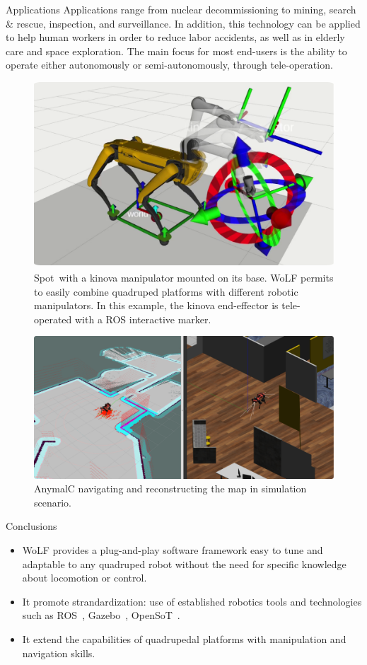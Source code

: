 	
\vspace{-20pt}	
\begin{myblock}{\large Applications} 
Applications range from nuclear decommissioning to mining, search \& rescue, inspection, and surveillance. In addition, this technology can be applied to help human workers
in order to reduce labor accidents, as well as in elderly
care and space exploration. The main focus for most end-users is the ability to operate either autonomously or semi-autonomously, through tele-operation.
%	
\begin{figure}[thb!]
	\centering
	\includegraphics[width=0.5\columnwidth]{images/spot_arm.pdf}
	\caption{Spot\textsuperscript\textregistered \  with a kinova manipulator mounted on its base. WoLF permits to easily combine quadruped platforms with different robotic manipulators. In this example, the kinova end-effector is tele-operated with a ROS interactive marker.}
	\label{fig:spot_arm}
\end{figure}
%
%
\begin{figure}[thb!]
	\centering
	\includegraphics[width=0.5\columnwidth]{images/anymalc_navigation.pdf}
	\caption{AnymalC navigating and reconstructing the map in simulation scenario.}
	\label{fig:anymalc_navigation}
\end{figure}
%
\end{myblock}

\begin{myblock}{{\large Conclusions}}
\begin{itemize}

	\item WoLF provides a plug-and-play software framework easy to tune and adaptable to any quadruped robot without the need for specific knowledge about locomotion or control.
	\item It promote strandardization: use of established robotics tools and technologies such as ROS~\cite{quigley2009ros}, Gazebo~\cite{agueroVRC2015}, OpenSoT~\cite{hoffmanOpenSoT2017}.
	\item It extend the capabilities of quadrupedal platforms with manipulation and navigation skills.

\end{itemize}
	
\end{myblock} 
